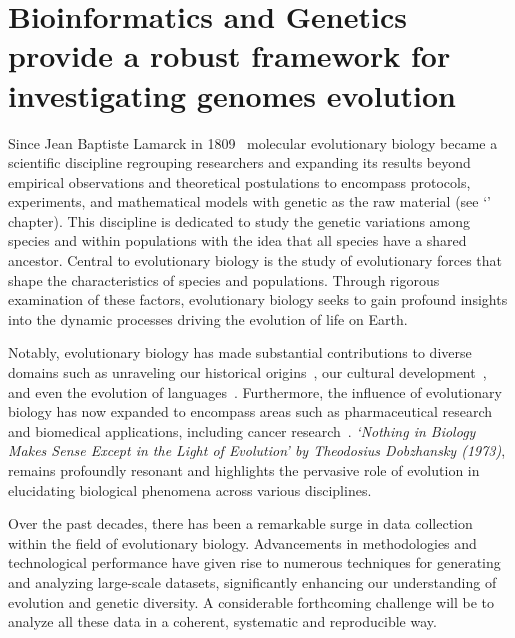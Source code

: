 \thispagestyle{empty}
\chapter{Bioinformatics and Genetics provide a robust framework for investigating genomes evolution}
{\hypersetup{linkcolor=GREYDARK}\minitoc}
\label{chap:intro-biol_evol}

Since Jean Baptiste Lamarck in 1809~\citep{lamarck_philosophie_1809} molecular evolutionary biology became a scientific discipline regrouping researchers and expanding its results beyond empirical observations and theoretical postulations to encompass protocols, experiments, and mathematical models with genetic as the raw material (see `' chapter). This discipline is dedicated to study the genetic variations among species and within populations with the idea that all species have a shared ancestor. Central to evolutionary biology is the study of evolutionary forces that shape the characteristics of species and populations. Through rigorous examination of these factors, evolutionary biology seeks to gain profound insights into the dynamic processes driving the evolution of life on Earth.

Notably, evolutionary biology has made substantial contributions to diverse domains such as unraveling our historical origins~\citep{cann_mitochondrial_1987, vigilant_african_1991, krause_derived_2007, somel_microrna-driven_2011, callaway_oldest_2021}, our cultural development~\citep{pagel_wired_2013}, and even the evolution of languages~\citep{nettle_genetic_2003, levinson_tools_2012}. Furthermore, the influence of evolutionary biology has now expanded to encompass areas such as pharmaceutical research and biomedical applications, including cancer research~\citep{casas-selves_how_2011, crespi_evolutionary_2005}. 
\textit{`Nothing in Biology Makes Sense Except in the Light of Evolution' by Theodosius Dobzhansky (1973)}, remains profoundly resonant and highlights the pervasive role of evolution in elucidating biological phenomena across various disciplines.

Over the past decades, there has been a remarkable surge in data collection within the field of evolutionary biology. Advancements in methodologies and technological performance have given rise to numerous techniques for generating and analyzing large-scale datasets, significantly enhancing our understanding of evolution and genetic diversity. A considerable forthcoming challenge will be to analyze all these data in a coherent, systematic and reproducible way.

